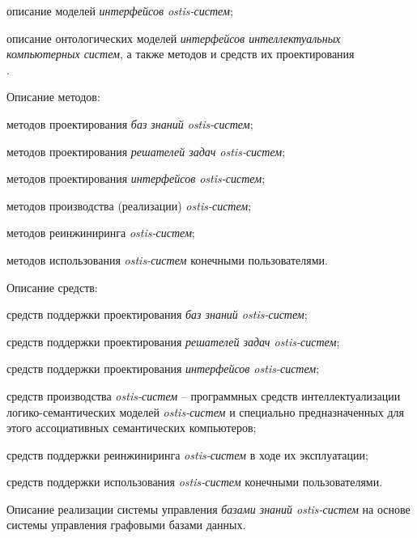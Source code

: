 \begin{SCn}
{\begin{scnitemize}
\begin{scnitemizeii}
\begin{scnitemizeiii}
					\item описание моделей \textit{интерфейсов ostis-систем};
					\item описание онтологических моделей \textit{интерфейсов интеллектуальных компьютерных систем}, а также методов и средств их проектирования\\
					.
				\end{scnitemizeiii}
				\item Описание методов:
				\begin{scnitemizeiii}
					\item методов проектирования \textit{баз знаний ostis-систем};
					\item методов проектирования \textit{решателей задач ostis-систем};
					\item методов проектирования \textit{интерфейсов ostis-систем};
					\item методов производства (реализации) \textit{ostis-систем};
					\item методов реинжиниринга \textit{ostis-систем};
					\item методов использования \textit{ostis-систем} конечными пользователями.
				\end{scnitemizeiii}
				\item Описание средств:
				\begin{scnitemizeiii}
					\item средств поддержки проектирования \textit{баз знаний ostis-систем};
					\item средств поддержки проектирования \textit{решателей задач ostis-систем};
					\item средств поддержки проектирования \textit{интерфейсов ostis-систем};
					\item средств производства \textit{ostis-систем} -- программных средств интеллектуализации логико-семантических моделей \textit{ostis-систем} и специально предназначенных для этого ассоциативных семантических компьютеров;
					\item средств поддержки реинжиниринга \textit{ostis-систем} в ходе их эксплуатации;
					\item средств поддержки использования \textit{ostis-систем} конечными пользователями.
				\end{scnitemizeiii}
				\item Описание реализации системы управления \textit{базами знаний ostis-систем} на основе системы управления графовыми базами данных.

\end{scnitemizeii}
\end{scnitemize}}
\end{SCn}
